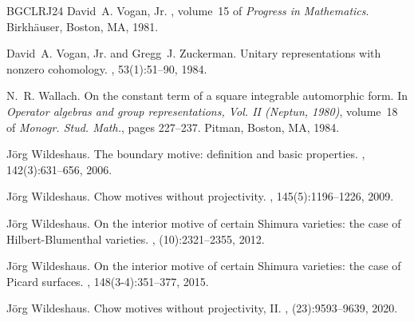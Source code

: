 \documentclass[11pt, a4paper]{amsart}
\theoremstyle{plain}
\theoremstyle{definition}
\numberwithin{equation}{section}
\begin{document}
\begin{thebibliography}{BGCLRJ24}
David~A. Vogan, Jr.
, volume~15 of
  {\em Progress in Mathematics}.
\newblock Birkh\"auser, Boston, MA, 1981.

David~A. Vogan, Jr. and Gregg~J. Zuckerman.
\newblock Unitary representations with nonzero cohomology.
, 53(1):51--90, 1984.

N.~R. Wallach.
\newblock On the constant term of a square integrable automorphic form.
\newblock In {\em Operator algebras and group representations, {V}ol. {II}
  ({N}eptun, 1980)}, volume~18 of {\em Monogr. Stud. Math.}, pages 227--237.
  Pitman, Boston, MA, 1984.

J\"org Wildeshaus.
\newblock The boundary motive: definition and basic properties.
, 142(3):631--656, 2006.

J\"org Wildeshaus.
\newblock Chow motives without projectivity.
, 145(5):1196--1226, 2009.

J\"org Wildeshaus.
\newblock On the interior motive of certain {S}himura varieties: the case of
  {H}ilbert-{B}lumenthal varieties.
, (10):2321--2355, 2012.

J\"org Wildeshaus.
\newblock On the interior motive of certain {S}himura varieties: the case of
  {P}icard surfaces.
, 148(3-4):351--377, 2015.

J\"org Wildeshaus.
\newblock Chow motives without projectivity, {II}.
, (23):9593--9639, 2020.

\end{thebibliography}
\end{document}
